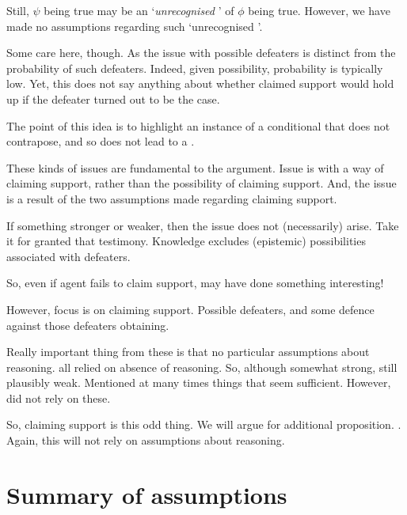 \begin{note}
  Still,  \(\psi\) being true may be an `\emph{unrecognised} \requ{}' of \(\phi\) being true.
  However, we have made no assumptions regarding such `unrecognised '.

  {
    \color{red}
    Some care here, though.
    As the issue with possible defeaters is distinct from the probability of such defeaters.
    Indeed, given possibility, probability is typically low.
    Yet, this does not say anything about whether claimed support would hold up if the defeater turned out to be the case.

    The point of this {\color{red} idea} is to highlight an instance of a conditional that does not contrapose, and so does not lead to a \requ{}.
  }
\end{note}

\begin{note}
  These kinds of issues are fundamental to the argument.
  Issue is with a way of claiming support, rather than the possibility of claiming support.
  And, the issue is a result of the two assumptions made regarding claiming support.

  If something stronger or weaker, then the issue does not (necessarily) arise.
  Take it for granted that testimony.
  Knowledge excludes (epistemic) possibilities associated with defeaters.

  So, even if agent fails to claim support, may have done something interesting!

  However, focus is on claiming support.
  Possible defeaters, and some defence against those defeaters obtaining.

  Really important thing from these  is that no particular assumptions about reasoning.
   all relied on absence of reasoning.
  So, although somewhat strong, still plausibly weak.
  Mentioned at many times things that seem sufficient.
  However, did not rely on these.

  So, claiming support is this odd thing.
  We will argue for additional proposition.
  \nI{}.
  Again, this will not rely on assumptions about reasoning.
\end{note}

\section{Summary of assumptions}

